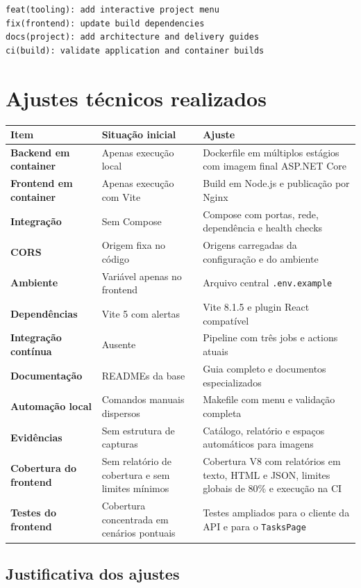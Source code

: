 \documentclass[12pt,a4paper,openany]{report}
\begin{document}
\begin{lstlisting}
feat(tooling): add interactive project menu
fix(frontend): update build dependencies
docs(project): add architecture and delivery guides
ci(build): validate application and container builds
\end{lstlisting}

\chapter{Ajustes técnicos realizados}

\begin{longtable}{>{\bfseries}p{} p{} p{}}
\toprule
Item & Situação inicial & Ajuste \\
\midrule
\endhead
Backend em container & Apenas execução local & Dockerfile em múltiplos estágios com imagem final ASP.NET Core \\
Frontend em container & Apenas execução com Vite & Build em Node.js e publicação por Nginx \\
Integração & Sem Compose & Compose com portas, rede, dependência e health checks \\
CORS & Origem fixa no código & Origens carregadas da configuração e do ambiente \\
Ambiente & Variável apenas no frontend & Arquivo central \texttt{.env.example} \\
Dependências & Vite 5 com alertas & Vite 8.1.5 e plugin React compatível \\
Integração contínua & Ausente & Pipeline com três jobs e actions atuais \\
Documentação & READMEs da base & Guia completo e documentos especializados \\
Automação local & Comandos manuais dispersos & Makefile com menu e validação completa \\
Evidências & Sem estrutura de capturas & Catálogo, relatório e espaços automáticos para imagens \\
Cobertura do frontend & Sem relatório de cobertura e sem limites mínimos & Cobertura V8 com relatórios em texto, HTML e JSON, limites globais de 80\% e execução na CI \\
Testes do frontend & Cobertura concentrada em cenários pontuais & Testes ampliados para o cliente da API e para o \texttt{TasksPage} \\
\bottomrule
\end{longtable}

\section{Justificativa dos ajustes}
\end{document}
